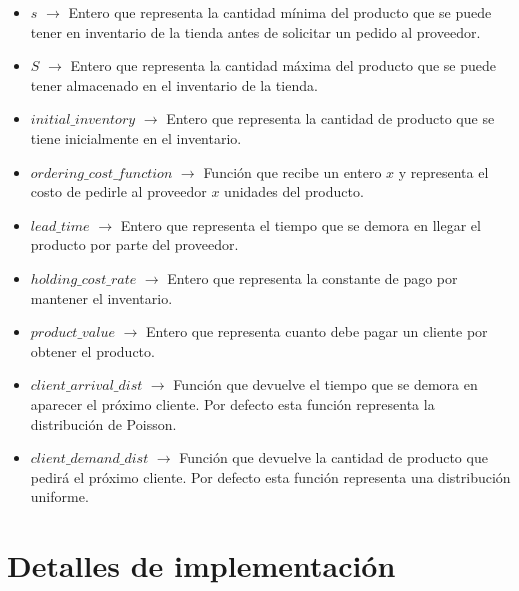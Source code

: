 \documentclass{article}
\begin{document}
\begin{itemize}
    \item $s$ $\to$ Entero que representa la cantidad mínima del producto que se puede tener en inventario de la tienda antes de solicitar un pedido al proveedor.
    \item $S$ $\to$ Entero que representa la cantidad máxima del producto que se puede tener almacenado en el inventario de la tienda.
    \item $initial\_inventory$ $\to$ Entero que representa la cantidad de producto que se tiene inicialmente en el inventario.
    \item $ordering\_cost\_function$ $\to$ Función que recibe un entero $x$ y representa el costo de pedirle al proveedor $x$ unidades del producto.
    \item $lead\_time$ $\to$ Entero que representa el tiempo que se demora en llegar el producto por parte del proveedor.
    \item $holding\_cost\_rate$ $\to$ Entero que representa la constante de pago por mantener el inventario.
    \item $product\_value$ $\to$ Entero que representa cuanto debe pagar un cliente por obtener el producto.
    \item $client\_arrival\_dist$ $\to$ Función que devuelve el tiempo que se demora en aparecer el próximo cliente. Por defecto esta función representa la distribución de Poisson.
    \item $client\_demand\_dist$ $\to$ Función que devuelve la cantidad de producto que pedirá el próximo cliente. Por defecto esta función representa una distribución uniforme.
\end{itemize}

\section{Detalles de implementación}
\end{document}
